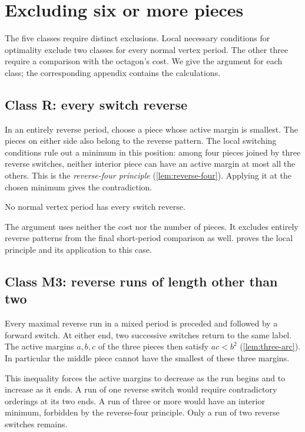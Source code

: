 \section{Excluding six or more pieces}\label{sec:outline-classes}

The five classes require distinct exclusions. Local necessary conditions for optimality exclude
two classes for every normal vertex period. The other three require a comparison with the
octagon's cost. We give the argument for each class; the corresponding appendix contains the
calculations.

\subsection{Class R: every switch reverse}\label{sec:outline-reverse}

In an entirely reverse period, choose a piece whose active margin is smallest. The pieces on
either side also belong to the reverse pattern. The local switching conditions rule out a minimum
in this position: among four pieces joined by three reverse switches, neither interior piece can
have an active margin at most all the others. This is the \emph{reverse-four principle}
(\cref{lem:reverse-four}). Applying it at the chosen minimum gives the contradiction.

\begin{theorem}\label{thm:class-R}
No normal vertex period has every switch reverse.
\end{theorem}

The argument uses neither the cost nor the number of pieces. It excludes entirely reverse
patterns from the final short-period comparison as well.  proves the local
principle and its application to this case.

\subsection{Class M3: reverse runs of length other than two}\label{sec:outline-mixed-runs}

Every maximal reverse run in a mixed period is preceded and followed by a forward switch. At
either end, two successive switches return to the same label. The active margins $a,b,c$ of the
three pieces then satisfy $ac<b^2$ (\cref{lem:three-arc}). In particular the middle piece cannot
have the smallest of these three margins.

This inequality forces the active margins to decrease as the run begins and to increase as it
ends. A run of one reverse switch would require contradictory orderings at its two ends. A run
of three or more would have an interior minimum, forbidden by the reverse-four principle. Only
a run of two reverse switches remains.

